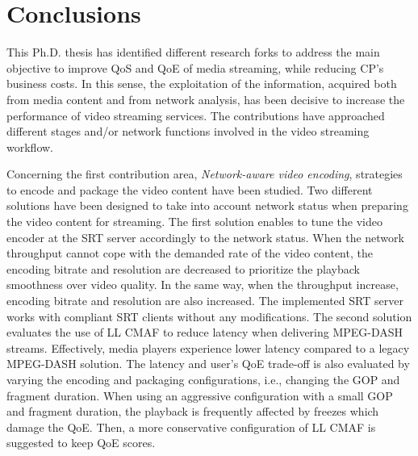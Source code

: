 
\section{Conclusions}

This Ph.D. thesis has identified different research forks to address the main objective to improve QoS and QoE of media streaming, while reducing CP's business costs. In this sense, the exploitation of the information, acquired both from media content and from network analysis, has been decisive to increase the performance of video streaming services. The contributions have approached different stages and/or network functions involved in the video streaming workflow.

Concerning the first contribution area, \textit{Network-aware video encoding}, strategies to encode and package the video content have been studied. Two different solutions have been designed to take into account network status when preparing the video content for streaming.
The first solution enables to tune the video encoder at the SRT server accordingly to the network status. When the network throughput cannot cope with the demanded rate of the video content, the encoding bitrate and resolution are decreased to prioritize the playback smoothness over video quality. In the same way, when the throughput increase, encoding bitrate and resolution are also increased. The implemented SRT server works with compliant SRT clients without any modifications.
The second solution evaluates the use of LL CMAF to reduce latency when delivering MPEG-DASH streams. Effectively, media players experience lower latency compared to a legacy MPEG-DASH solution. The latency and user's QoE trade-off is also evaluated by varying the encoding and packaging configurations, i.e., changing the GOP and fragment duration. When using an aggressive configuration with a small GOP and fragment duration, the playback is frequently affected by freezes which damage the QoE. Then, a more conservative configuration of LL CMAF is suggested to keep QoE scores.


